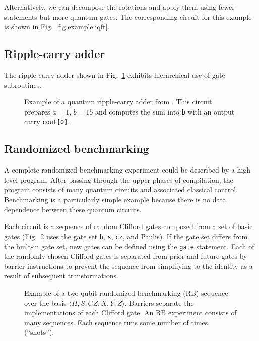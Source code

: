 \documentclass[USenglish,12pt,fleqn]{article} %
\newcommand*{\code}{\texttt}
\begin{document}
Alternatively, we can decompose the rotations and apply them using fewer statements but more quantum gates. The corresponding circuit for this example is shown in Fig.~\ref{fig:example:iqft}.

\subsection{Ripple-carry adder}

The ripple-carry adder \cite{cuccaro04} shown in Fig.~\ref{fig:example:add} exhibits hierarchical use of gate subroutines.

\begin{figure}
\centering

\caption{Example of a quantum ripple-carry adder from \cite{cuccaro04}. This circuit prepares $a=1$, $b=15$ and computes the sum into \code{b} with an output carry \code{cout[0]}.\label{fig:example:add}}
\end{figure}

\subsection{Randomized benchmarking}

A complete randomized benchmarking experiment could be described by a high level program. After passing through the upper phases of compilation, the program consists of many quantum circuits and associated classical control. Benchmarking is a particularly simple example because there is no data dependence between these quantum circuits. 

Each circuit is a sequence of random Clifford gates composed from a set of basic gates (Fig.~\ref{fig:example:rb} uses the gate set \code{h}, \code{s}, \code{cz}, and Paulis). If the gate set differs from the built-in gate set, new gates can be defined using the \code{gate} statement. Each of the randomly-chosen Clifford gates is separated from prior and future gates by barrier instructions to prevent the sequence from simplifying to the identity as a result of subsequent transformations.

\begin{figure}
\centering

\caption{Example of a two-qubit randomized benchmarking (RB) sequence over the basis $\langle H, S, CZ, X, Y, Z\rangle$. Barriers separate the implementations of each Clifford gate. An RB experiment consists of many sequences. Each sequence runs some number of times (``shots'').\label{fig:example:rb}}
\end{figure}
\end{document}
